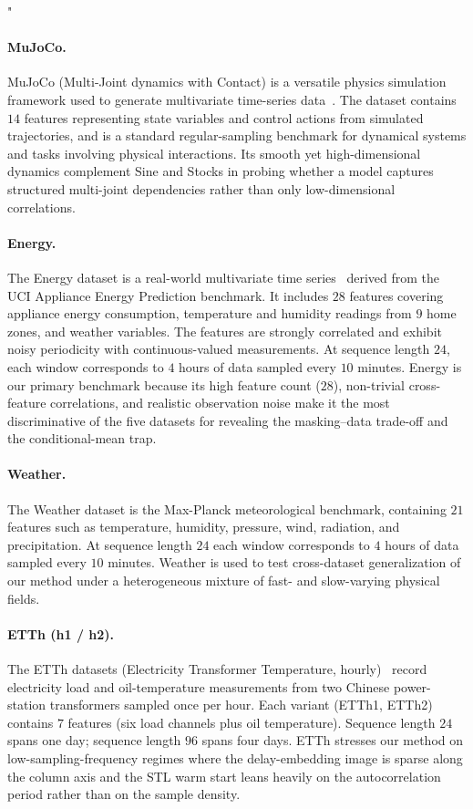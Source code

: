 "\documentclass{article}
\theoremstyle{plain}
\theoremstyle{definition}
\theoremstyle{remark}
\begin{document}
\paragraph{MuJoCo.}
MuJoCo (Multi-Joint dynamics with Contact) is a versatile physics simulation framework used to generate multivariate time-series data~\citep{todorov2012mujoco}. The dataset contains $14$ features representing state variables and control actions from simulated trajectories, and is a standard regular-sampling benchmark for dynamical systems and tasks involving physical interactions. Its smooth yet high-dimensional dynamics complement Sine and Stocks in probing whether a model captures structured multi-joint dependencies rather than only low-dimensional correlations.

\paragraph{Energy.}
The Energy dataset is a real-world multivariate time series~\citep{candanedo2017data} derived from the UCI Appliance Energy Prediction benchmark. It includes $28$ features covering appliance energy consumption, temperature and humidity readings from $9$ home zones, and weather variables. The features are strongly correlated and exhibit noisy periodicity with continuous-valued measurements. At sequence length $24$, each window corresponds to $4$ hours of data sampled every $10$ minutes. Energy is our primary benchmark because its high feature count ($28$), non-trivial cross-feature correlations, and realistic observation noise make it the most discriminative of the five datasets for revealing the masking--data trade-off and the conditional-mean trap.

\paragraph{Weather.}
The Weather dataset is the Max-Planck meteorological benchmark, containing $21$ features such as temperature, humidity, pressure, wind, radiation, and precipitation. At sequence length $24$ each window corresponds to $4$ hours of data sampled every $10$ minutes. Weather is used to test cross-dataset generalization of our method under a heterogeneous mixture of fast- and slow-varying physical fields.

\paragraph{ETTh (h1 / h2).}
The ETTh datasets (Electricity Transformer Temperature, hourly)~\citep{zhou2021informer} record electricity load and oil-temperature measurements from two Chinese power-station transformers sampled once per hour. Each variant (ETTh1, ETTh2) contains $7$ features (six load channels plus oil temperature). Sequence length $24$ spans one day; sequence length $96$ spans four days. ETTh stresses our method on low-sampling-frequency regimes where the delay-embedding image is sparse along the column axis and the STL warm start leans heavily on the autocorrelation period rather than on the sample density.
\end{document}
